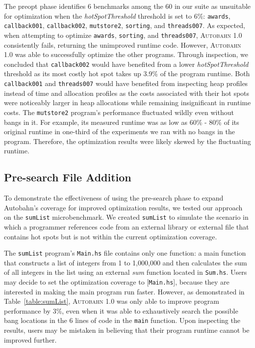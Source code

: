 \documentclass[format=sigplan, review=true, 9pt]{acmart}
\newcommand{\tblref}[1]{Table~\ref{#1}}
\newcommand{\hotspots}[0]{hot spots}
\newcommand{\hotspotcost}[0]{\textit{hotSpotThreshold}}
\newcommand{\Ao}[0]{\textsc{Autobahn 1.0}}
\newcommand{\preopt}[0]{pre-search}
\newcommand{\Preopt}[0]{Pre-search}
\newcommand{\unimp}[0]{unimproved}
\begin{document}
The preopt{} phase identifies 6 benchmarks among the 60 in our suite
as unsuitable for optimization when the \hotspotcost{}
threshold is set to 6\%:  \texttt{awards}, \texttt{callback001},
\texttt{callback002}, \texttt{mutstore2}, \texttt{sorting}, and \texttt{threads007}. As
expected, when attempting to
optimize \texttt{awards}, \texttt{sorting},
and \texttt{threads007}, \Ao{} consistently fails, returning
the \unimp{} runtime code. However, \Ao{} was able to
successfully optimize the other programs. Through inspection, we
concluded that \texttt{callback002} would have benefited from a
lower \hotspotcost{} threshold as its most costly hot spot takes up
3.9\% of the program runtime. Both \texttt{callback001}
and \texttt{threads007} would have benefited from inspecting heap
profiles instead of time and allocation profiles as the costs
associated with their hot spots were noticeably larger in heap
allocations while remaining insignificant in runtime
costs. The \texttt{mutstore2} program's performance fluctuated wildly
even without bangs in it. For example, its measured runtime was as low
as 60\% - 80\% of its original runtime in one-third of the experiments
we ran with no bangs in the program. Therefore, the optimization
results were likely skewed by the fluctuating runtime.

\subsection{\Preopt{} File Addition}
To demonstrate the effectiveness of using the \preopt{} phase to
expand Autobahn's coverage for improved optimization results, we
tested our approach on the \texttt{sumList} microbenchmark. We
created \texttt{sumList} to simulate the scenario in which a
programmer references code from an external library or external file
that contains \hotspots{} but is not within the current optimization
coverage. 

The \texttt{sumList} program's \texttt{Main.hs} file contains only one
function: a main function that constructs a list of integers from 1 to
1,000,000 and then calculates the sum of all integers in the list using an
external \textit{sum} function located in \texttt{Sum.hs}. Users
may decide to set the optimization coverage to [\texttt{Main.hs}],
because they are interested in making the main program run
faster. However, as demonstrated in \tblref{table:sumList}, \Ao{} was only able to
improve program performance by 3\%, even when it was able to
exhaustively search the possible bang locations in the 6 lines of code in the \texttt{main}
function. Upon inspecting the results, users may be mistaken in
believing that their program runtime cannot be improved
further.
\end{document}
